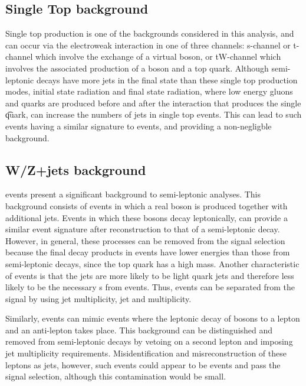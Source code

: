 \subsection{Single Top background}
\label{ss:single_top}
Single top production is one of the backgrounds considered in this analysis, and can occur via the electroweak
interaction in one of three channels: s-channel or t-channel which involve the exchange of a virtual \W boson,
or tW-channel which involves the associated production of a \W boson and a top quark. Although semi-leptonic
\ttbar decays have more jets in the final state than these single top production modes, initial state
radiation and final state radiation, where low energy gluons and quarks are produced before and after the
interaction that produces the single \t quark, can increase the numbers of jets in single top events. This can
lead to such events having a similar signature to \ttbar events, and providing a non-negligble background.

\subsection{W/Z+jets background}
\label{ss:w_z_plus_jets}
\WpJets events present a significant background to semi-leptonic \ttbar analyses. This background
consists of events in which a real \W boson is produced together with additional jets. Events in which these
\W bosons decay leptonically, can provide a similar event signature after reconstruction to that of a
semi-leptonic \ttbar decay. However, in general, these processes can be removed from the signal selection
because the final decay products in \WpJets events have lower energies than those from semi-leptonic \ttbar
decays, since the top quark has a high mass. Another characteristic of \WpJets events is that the jets are
more likely to be light quark jets and therefore less likely to be the necessary \bjet s from \ttbar events.
Thus, \WpJets events can be separated from the \ttbar signal by using jet multiplicity, jet \pt and \bjet
multiplicity.

Similarly, \ZpJets events can mimic \ttbar events where the leptonic decay of \Z bosons to a lepton and an
anti-lepton takes place. This background can be distinguished and removed from semi-leptonic \ttbar decays by
vetoing on a second lepton and imposing jet multiplicity requirements. Misidentification and misreconstruction
of these leptons as jets, however, such events could appear to be \ttbar events and pass the signal selection,
although this contamination would be small.

